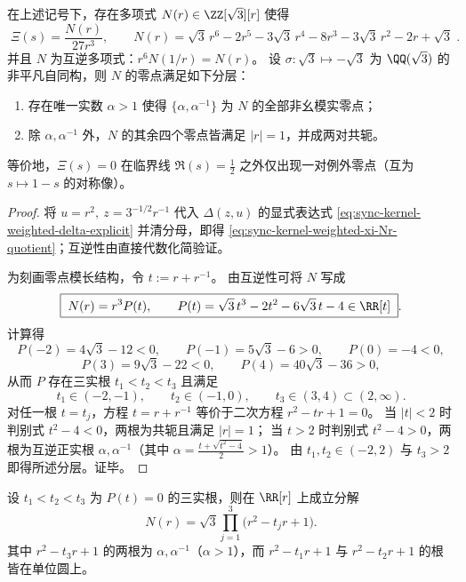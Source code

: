 \begin{theorem}[完成化零点的单例外对结构]\label{thm:sync-kernel-weighted-xi-single-exception-pair}
在上述记号下，存在多项式 \(N(r)\in\ZZ[\sqrt3][r]\) 使得
\begin{equation}\label{eq:sync-kernel-weighted-xi-Nr-quotient}
\boxed{\;
\Xi(s)=\frac{N(r)}{27r^3},
\qquad
N(r)=\sqrt3\,r^6-2r^5-3\sqrt3\,r^4-8r^3-3\sqrt3\,r^2-2r+\sqrt3\; }.
\end{equation}
并且 \(N\) 为互逆多项式：\(r^6N(1/r)=N(r)\)。
设 \(\sigma:\sqrt3\mapsto-\sqrt3\) 为 \(\QQ(\sqrt3)\) 的非平凡自同构，则 \(N\) 的零点满足如下分层：
\begin{enumerate}
  \item 存在唯一实数 \(\alpha>1\) 使得 \(\{\alpha,\alpha^{-1}\}\) 为 \(N\) 的全部非幺模实零点；
  \item 除 \(\alpha,\alpha^{-1}\) 外，\(N\) 的其余四个零点皆满足 \(|r|=1\)，并成两对共轭。
\end{enumerate}
等价地，\(\Xi(s)=0\) 在临界线 \(\Re(s)=\tfrac12\) 之外仅出现一对例外零点（互为 \(s\mapsto 1-s\) 的对称像）。
\end{theorem}

\begin{proof}
将 \(u=r^2,\ z=3^{-1/2}r^{-1}\) 代入 \(\Delta(z,u)\) 的显式表达式 \eqref{eq:sync-kernel-weighted-delta-explicit} 并清分母，即得 \eqref{eq:sync-kernel-weighted-xi-Nr-quotient}；互逆性由直接代数化简验证。
\par
为刻画零点模长结构，令 \(t:=r+r^{-1}\)。
由互逆性可将 \(N\) 写成
\begin{equation}\label{eq:sync-kernel-weighted-Nr-pt}
\boxed{\;
N(r)=r^3P(t),
\qquad
P(t)=\sqrt3\,t^3-2t^2-6\sqrt3\,t-4\in\RR[t]\; }.
\end{equation}
计算得
\[
P(-2)=4\sqrt3-12<0,\qquad
P(-1)=5\sqrt3-6>0,\qquad
P(0)=-4<0,
\]
\[
P(3)=9\sqrt3-22<0,\qquad
P(4)=40\sqrt3-36>0,
\]
从而 \(P\) 存在三实根 \(t_1<t_2<t_3\) 且满足
\[
t_1\in(-2,-1),\qquad t_2\in(-1,0),\qquad t_3\in(3,4)\subset(2,\infty).
\]
对任一根 \(t=t_j\)，方程 \(t=r+r^{-1}\) 等价于二次方程 \(r^2-tr+1=0\)。
当 \(|t|<2\) 时判别式 \(t^2-4<0\)，两根为共轭且满足 \(|r|=1\)；
当 \(t>2\) 时判别式 \(t^2-4>0\)，两根为互逆正实根 \(\alpha,\alpha^{-1}\)（其中 \(\alpha=\frac{t+\sqrt{t^2-4}}{2}>1\)）。
由 \(t_1,t_2\in(-2,2)\) 与 \(t_3>2\) 即得所述分层。证毕。
\end{proof}

\begin{corollary}\label{cor:sync-kernel-weighted-xi-three-quadratics}
设 \(t_1<t_2<t_3\) 为 \(P(t)=0\) 的三实根，则在 \(\RR[r]\) 上成立分解
\[
N(r)=\sqrt3\prod_{j=1}^{3}\bigl(r^2-t_jr+1\bigr).
\]
其中 \(r^2-t_3r+1\) 的两根为 \(\alpha,\alpha^{-1}\)（\(\alpha>1\)），而 \(r^2-t_1r+1\) 与 \(r^2-t_2r+1\) 的根皆在单位圆上。
\end{corollary}

